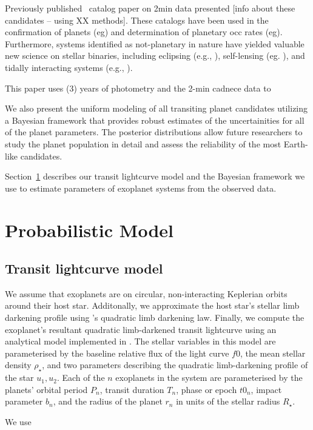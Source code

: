 \documentclass[linenumbers,floatfix,ApJL,twocolumn]{aastex631}
\begin{document}
Previously published \tess\ catalog paper on 2min data presented [info about these candidates -- using XX methods].
These catalogs have been used in the confirmation of planets (eg)  and determination of planetary occ rates (eg). 
Furthermore, systems identified as not-planetary in nature have yielded valuable new science on stellar binaries, including eclipsing (e.g., ), self-lensing (eg. ), and tidally interacting systems (e.g., ).

This paper uses (3) years of \tess photometry and the 2-min cadnece data to 

We also present the uniform modeling of all transiting planet candidates utilizing a Bayesian framework that provides robust estimates of the uncertainities for all of the planet parameters. 
The posterior distributions allow future researchers to study the planet population in detail and assess the reliability of the most Earth-like candidates.




Section~\ref{sec:prob-model} describes our transit lightcurve model and the Bayesian framework we use to estimate parameters of exoplanet systems from the observed data.

\section{Probabilistic Model} \label{sec:prob-model}

\subsection{Transit lightcurve model}
We assume that exoplanets are on circular, non-interacting Keplerian orbits around their host star.
Additonally, we approximate the host star's stellar limb darkening profile using \citet{Kipping:2013}'s quadratic limb darkening law.
Finally, we compute the exoplanet's resultant quadratic limb-darkened transit lightcurve using an analytical model implemented in \starry.
The stellar variables in this model are parameterised by
the baseline relative flux of the light curve $f0$,
the mean stellar density $\rho_\star$,
and two parameters describing the quadratic limb-darkening profile of the
star $u_1, u_2$.
Each of the $n$ exoplanets in the system are parameterised by the planets'
orbital period $P_{n}$,
transit duration $T_{n}$,
phase or epoch $t0_n$,
impact parameter $b_n$,
and the radius of the planet $r_n$ in units of the stellar radius $R_\star$.

We use \exoplanet\, \lightkurve
\end{document}

